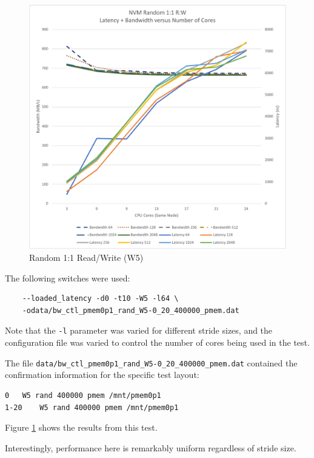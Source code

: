 \begin{figure}
    \centering
    \caption{Random 1:1 Read/Write (W5)}\label{chart:random:W5}
    \includegraphics[scale=0.5]{charts/random-w5-crop.pdf}
\end{figure}

The following switches were used:

\begin{verbatim}
    --loaded_latency -d0 -t10 -W5 -l64 \
    -odata/bw_ctl_pmem0p1_rand_W5-0_20_400000_pmem.dat
\end{verbatim}

Note that the \verb+-l+ parameter was varied for different
stride sizes, and the configuration file was varied to control
the number of cores being used in the test.

The file \verb+data/bw_ctl_pmem0p1_rand_W5-0_20_400000_pmem.dat+ contained the confirmation information
for the specific test layout:

\begin{verbatim}
0	W5 rand 400000 pmem /mnt/pmem0p1
1-20	W5 rand 400000 pmem /mnt/pmem0p1
\end{verbatim}

Figure \ref{chart:random:W5} shows the results from this test.

Interestingly, performance here is remarkably uniform regardless
of stride size.

